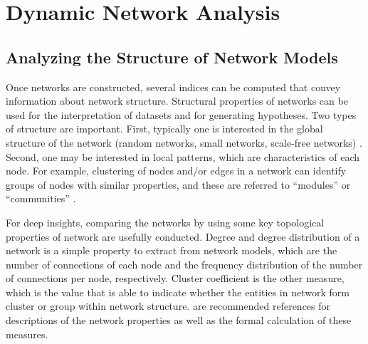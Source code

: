 \section*{Dynamic Network Analysis}



\subsection*{Analyzing the Structure of Network Models}

Once networks are constructed, several indices can be computed that convey information about network structure. Structural properties of networks can be used for the interpretation of datasets and for generating hypotheses. Two types of structure are important. First, typically one is interested in the global structure of the network (random networks, small networks, scale-free networks) . Second, one may be interested in local patterns, which are characteristics of each node. For example, clustering of nodes and/or edges in a network can identify groups of nodes with similar properties, and these are referred to ``modules'' or ``communities''  .

For deep insights, comparing the networks by using some key topological properties of network are usefully conducted. Degree and degree distribution of a network is a simple property to extract from network models, which are the number of connections of each node and the frequency distribution of the number of connections per node, respectively. Cluster coefficient is the other measure, which is the value that is able to indicate whether the entities in network form cluster or group within network structure.  are recommended references for descriptions of the network properties as well as the formal calculation of these measures.


